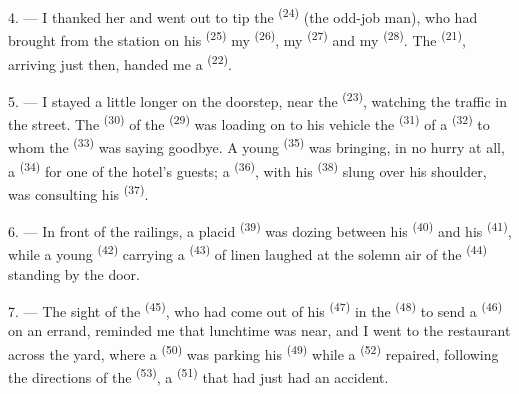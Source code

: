 4. --- I thanked her and went out to tip the  \textsuperscript{(24)}
(the odd-job man), who had brought from the station on his
 \textsuperscript{(25)} my  \textsuperscript{(26)}, my
 \textsuperscript{(27)} and my  \textsuperscript{(28)}.
The  \textsuperscript{(21)}, arriving just then, handed me a
 \textsuperscript{(22)}.

5. --- I stayed a little longer on the doorstep, near the 
\textsuperscript{(23)}, watching the traffic in the street. The 
\textsuperscript{(30)} of the  \textsuperscript{(29)} was loading on to his
vehicle the  \textsuperscript{(31)} of a  \textsuperscript{(32)} to whom
the  \textsuperscript{(33)} was saying goodbye. A young
 \textsuperscript{(35)} was bringing, in no hurry at all, a
 \textsuperscript{(34)} for one of the hotel's guests; a
 \textsuperscript{(36)}, with his  \textsuperscript{(38)} slung over
his shoulder, was consulting his  \textsuperscript{(37)}.

\VUsaut{4.0mm}
\VUsaut{3.0mm}

6. --- In front of the railings, a placid  \textsuperscript{(39)} was
dozing between his  \textsuperscript{(40)} and his
 \textsuperscript{(41)}, while a young 
\textsuperscript{(42)} carrying a  \textsuperscript{(43)} of linen laughed at the
solemn air of the  \textsuperscript{(44)} standing by the door.

7. --- The sight of the  \textsuperscript{(45)}, who had come out of his
 \textsuperscript{(47)} in the  \textsuperscript{(48)} to send a
 \textsuperscript{(46)} on an errand, reminded me that lunchtime was
near, and I went to the restaurant across the yard, where a
 \textsuperscript{(50)} was parking his  \textsuperscript{(49)} while a
 \textsuperscript{(52)} repaired, following the directions of the
 \textsuperscript{(53)}, a  \textsuperscript{(51)} that had
just had an accident.

